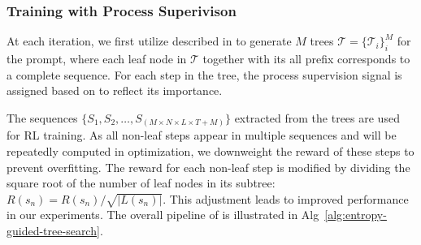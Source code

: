 \subsubsection{Training with Process Superivison}
At each iteration, we first utilize \treemodel described in  to generate $M$ trees \( \mathcal{T} = \{\mathcal{T}_i\}_i^{M} \) for the prompt, where each leaf node in \( \mathcal{T} \) together with its all prefix corresponds to a complete sequence. 
For each step in the tree, the process supervision signal is assigned based on  to reflect its importance.

The sequences \(\{ S_1, S_2, \ldots, S_{(M\times N \times L \times T + M)} \} \) extracted from the trees are used for RL training. As all non-leaf steps appear in multiple sequences and will be repeatedly computed in optimization, we downweight the reward of these steps to prevent overfitting. The reward for each non-leaf step is modified by dividing the square root of the number of leaf nodes in its subtree: \( R(s_n) = R(s_n) / \sqrt{|L(s_n)|} \). This adjustment leads to improved performance in our experiments. The overall pipeline of \model is illustrated in Alg~\ref{alg:entropy-guided-tree-search}.


